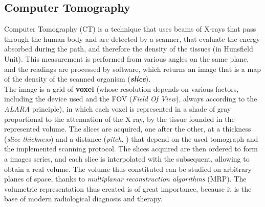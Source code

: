 \subsection{Computer Tomography}
Computer Tomography (CT) is a technique that uses beams of X-rays that pass through the human body and are detected by a scanner, that evaluate the energy absorbed during the path, and therefore the density of the tissues (in Hunsfield Unit). This measurement is performed from various angles on the same plane, and the readings are processed by software, which returns an image that is a map of the density of the scanned organism (\emph{\textbf{slice}}). \\
The image is a grid of \textbf{voxel} (whose resolution depends on various factors, including the device used and the FOV (\emph{Field Of View}), always according to the \emph{ALARA} principle), in which each voxel is represented in a shade of gray proportional to the attenuation of the X ray, by the tissue founded in the represented volume. The slices are acquired, one after the other, at a thickness (\emph{slice thickness}) and a distance (\emph{pitch}, \parencite{Reference23}) that depend on the used tomograph and the implemented scanning protocol. The slices acquired are then ordered to form a images series, and each slice is interpolated with the subsequent, allowing to obtain a real volume.
The volume thus constituted can be studied on arbitrary planes of space, thanks to \emph{multiplanar reconstruction algorithms} (MRP). The volumetric representation thus created is of great importance, because it is the base of modern radiological diagnosis and therapy.

